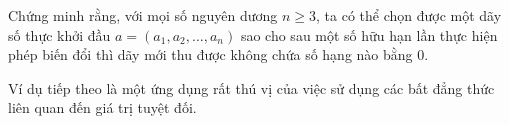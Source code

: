 \begin{vd}%
	Chứng minh rằng, với mọi số nguyên dương $n\ge 3$, ta có thể chọn được một dãy số thực khởi đầu $a=(a_1, a_2,\ldots, a_n)$ sao cho sau một số hữu hạn lần thực hiện phép biến đổi thì dãy mới thu được không chứa số hạng nào bằng $0$.
\end{vd}

Ví dụ tiếp theo là một ứng dụng rất thú vị của việc sử dụng các bất đẳng thức liên quan đến giá trị tuyệt đối.
